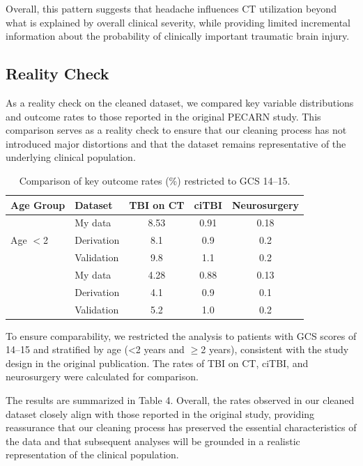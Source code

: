 \documentclass[11pt,letterpaper]{article}
\begin{document}
Overall, this pattern suggests that headache influences CT utilization beyond what is explained by overall clinical severity, while providing limited incremental information about the probability of clinically important traumatic brain injury.

\subsection{Reality Check}\label{reality-check}



As a reality check on the cleaned dataset, we compared key variable distributions and outcome rates to those reported in the original PECARN study. This comparison serves as a reality check to ensure that our cleaning process has not introduced major distortions and that the dataset remains representative of the underlying clinical population.

\begin{table}[ht]
\centering
\caption{Comparison of key outcome rates (\%) restricted to GCS 14--15.}
\label{tab:rate-compare}
\begin{tabular}{llccc}
\toprule
\textbf{Age Group} & \textbf{Dataset} 
& \textbf{TBI on CT} 
& \textbf{ciTBI} 
& \textbf{Neurosurgery} \\
\midrule
\multirow{3}{*}{Age $<$2} 
& My data     & 8.53 & 0.91 & 0.18 \\
& Derivation    & 8.1  & 0.9  & 0.2  \\
& Validation    & 9.8  & 1.1  & 0.2  \\
\addlinespace
\multirow{3}{*}{Age $\geq$2} 
& My data     & 4.28 & 0.88 & 0.13 \\
& Derivation    & 4.1  & 0.9  & 0.1  \\
& Validation    & 5.2  & 1.0  & 0.2  \\
\bottomrule
\end{tabular}
\end{table}

To ensure comparability, we restricted the
analysis to patients with GCS scores of 14--15 and stratified by age
(<2 years and $\geq$2 years), consistent with the study design in the
original publication. The rates of TBI on CT, ciTBI, and neurosurgery were calculated for comparison.

The results are summarized in Table 4. Overall, the rates observed in our cleaned dataset closely align with those reported in the original study, providing reassurance that our cleaning process has preserved the essential characteristics of the data and that subsequent analyses will be grounded in a realistic representation of the clinical population.
\end{document}
